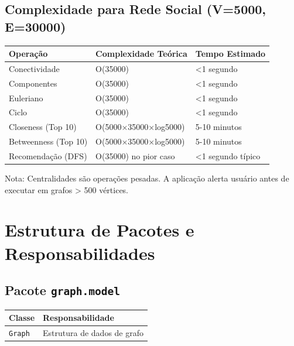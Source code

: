 \documentclass[12pt,a4paper]{article}
\begin{document}
    \subsection{Complexidade para Rede Social (V=5000, E=30000)}

    \begin{table}[h]
        \centering
        \begin{tabular}{|l|l|l|}
            \hline
            \textbf{Operação} & \textbf{Complexidade Teórica} & \textbf{Tempo Estimado} \\
            \hline
            Conectividade & O(35000) & <1 segundo \\
            \hline
            Componentes & O(35000) & <1 segundo \\
            \hline
            Euleriano & O(35000) & <1 segundo \\
            \hline
            Ciclo & O(35000) & <1 segundo \\
            \hline
            Closeness (Top 10) & O(5000×35000×log5000) & 5-10 minutos \\
            \hline
            Betweenness (Top 10) & O(5000×35000×log5000) & 5-10 minutos \\
            \hline
            Recomendação (DFS) & O(35000) no pior caso & <1 segundo típico \\
            \hline
        \end{tabular}
    \end{table}

    Nota: Centralidades são operações pesadas. A aplicação alerta usuário antes de executar em grafos > 500 vértices.

    \newpage

    \section{Estrutura de Pacotes e Responsabilidades}

    \subsection{Pacote \texttt{graph.model}}

    \begin{table}[h]
        \centering
        \begin{tabular}{|l|l|}
            \hline
            \textbf{Classe} & \textbf{Responsabilidade} \\
            \hline
            \texttt{Graph} & Estrutura de dados de grafo \\
            \hline
        \end{tabular}
    \end{table}
\end{document}
